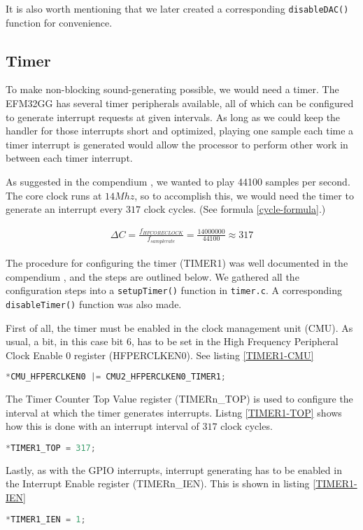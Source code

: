It is also worth mentioning that we later created a corresponding \texttt{disableDAC()} function for convenience.

\subsection{Timer}

To make non-blocking sound-generating possible, we would need a timer. The EFM32GG has several timer peripherals available, all of which can be configured to generate interrupt requests at given intervals. As long as we could keep the handler for those interrupts short and optimized, playing one sample each time a timer interrupt is generated would allow the processor to perform other work in between each timer interrupt.

As suggested in the compendium \cite[p.~42]{compendium}, we wanted to play 44100 samples per second. The core clock runs at $14Mhz$, so to accomplish this, we would need the timer to generate an interrupt every $317$ clock cycles. (See formula \ref{cycle-formula}.)

\begin{gather*}
\label{cycle-formula}
\Delta C = \frac{f_{HFCORECLOCK}}{f_{samplerate}} = \frac{14000000}{44100} \approx 317
\end{gather*}

The procedure for configuring the timer (TIMER1) was well documented in the compendium \cite[p.~40]{compendium}, and the steps are outlined below. We gathered all the configuration steps into a \texttt{setupTimer()} function in \texttt{timer.c}. A corresponding \texttt{disableTimer()} function was also made.

First of all, the timer must be enabled in the clock management unit (CMU). As usual, a bit, in this case bit 6, has to be set in the High Frequency Peripheral Clock Enable 0 register (HFPERCLKEN0). See listing \ref{TIMER1-CMU}

\begin{lstlisting}[language=C, label=TIMER1-CMU, caption=Enabling the timer in the CMU]
*CMU_HFPERCLKEN0 |= CMU2_HFPERCLKEN0_TIMER1;
\end{lstlisting}

The Timer Counter Top Value register (TIMERn\_TOP) is used to configure the interval at which the timer generates interrupts. Listng \ref{TIMER1-TOP} shows how this is done with an interrupt interval of $317$ clock cycles.

\begin{lstlisting}[language=C, label=TIMER1-TOP, caption=Setting interrupt interval]
*TIMER1_TOP = 317;
\end{lstlisting}

Lastly, as with the GPIO interrupts, interrupt generating has to be enabled in the Interrupt Enable register (TIMERn\_IEN). This is shown in listing \ref{TIMER1-IEN}

\begin{lstlisting}[language=C, label=TIMER1-IEN, caption=Interrupt generation]
*TIMER1_IEN = 1;
\end{lstlisting}
